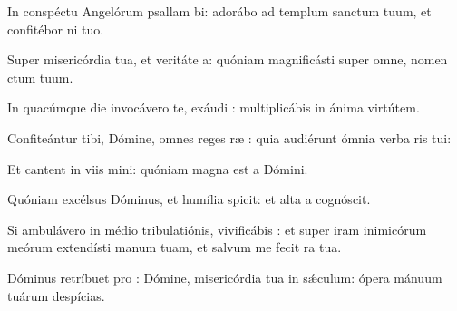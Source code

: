 \item {}

\item In conspéctu Angelórum psallam bi:\psstar{} adorábo ad templum sanctum tuum, et confitébor ni tuo.

\item Super misericórdia tua, et veritáte a:\psstar{} quóniam magnificásti super omne, nomen ctum tuum.

\item In quacúmque die invocávero te, exáudi :\psstar{} multiplicábis in ánima  virtútem.

\item Confiteántur tibi, Dómine, omnes reges ræ :\psstar{} quia audiérunt ómnia verba ris tui:

\item Et cantent in viis mini:\psstar{} quóniam magna est a Dómini.

\item Quóniam excélsus Dóminus, et humília spicit:\psstar{} et alta a  cognóscit.

\item Si ambulávero in médio tribulatiónis, vivificábis :\psstar{} et super iram inimicórum meórum extendísti manum tuam, et salvum me fecit ra tua.

\item Dóminus retríbuet pro :\psstar{} Dómine, misericórdia tua in sǽculum: ópera mánuum tuárum  despícias.
